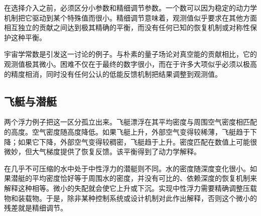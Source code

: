 在选择介入之前，必须区分小参数和精细调节参数。一个数可以因为稳定的动力学机制把它驱动到某个特殊值而很小。精细调节意味着，观测值似乎要求在其他方面相互独立的贡献之间达到极其精确的平衡，而没有任何已知的恢复机制或对称性保护这种平衡。

\begin{classroomqa}
\end{classroomqa}

宇宙学常数是引发这一讨论的例子。与朴素的量子场论对真空能的贡献相比，它的观测值极其微小。困难不仅在于最终的数字很小，而在于许多大项似乎必须以极高的精度相消，同时没有任何公认的低能反馈机制把结果调整到观测值。

\subsection{飞艇与潜艇}

两个浮力例子把这一区分孤立出来。飞艇漂浮在其平均密度与周围空气密度相匹配的高度。空气密度随高度降低。如果飞艇上升，外部空气变得较稀薄，飞艇趋于下降；如果它下降，外部空气变得较稠密，飞艇趋于上升。密度匹配在数值上可能很微妙，但大气梯度提供了恢复反馈。该平衡得到了动力学解释。

在几乎不可压缩的水中处于中性浮力的潜艇则不同。水的密度随深度变化很小。如果潜艇的平均密度恰好等于周围水的密度，并没有可比的、依赖深度的恢复机制来解释这种相等。微小的失配就会使它上升或下沉。实现中性浮力需要精确调整压载物和装载物。于是，除非某种控制系统或设计机制对此作出解释，否则这个微小的残差就是精细调节。

